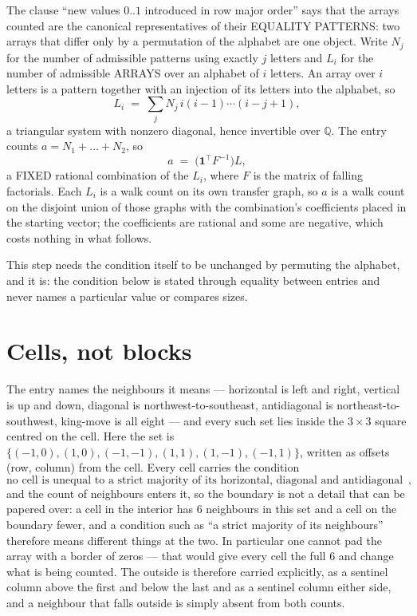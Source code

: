 \documentclass[11pt,a4paper]{article}
\theoremstyle{plain}
\theoremstyle{definition}
\begin{document}
The clause ``new values $0..1$ introduced in row major order'' says that the arrays
counted are the canonical representatives of their EQUALITY PATTERNS: two arrays that differ
only by a permutation of the alphabet are one object. Write $N_j$ for the number of admissible
patterns using exactly $j$ letters and $L_i$ for the number of admissible ARRAYS over an
alphabet of $i$ letters. An array over $i$ letters is a pattern together with an injection of
its letters into the alphabet, so
\[
L_i\;=\;\sum_{j}N_j\,i(i-1)\cdots(i-j+1),
\]
a triangular system with nonzero diagonal, hence invertible over $\mathbb{Q}$. The entry
counts $a=N_1+\dots+N_{2}$, so
\[
a\;=\;\bigl(\mathbf{1}^{\!\top}F^{-1}\bigr)L ,
\]
a FIXED rational combination of the $L_i$, where $F$ is the matrix of falling factorials.
Each $L_i$ is a walk count on its own transfer graph, so $a$ is a walk count on the disjoint
union of those graphs with the combination's coefficients placed in the starting vector; the
coefficients are rational and some are negative, which costs nothing in what follows.

This step needs the condition itself to be unchanged by permuting the alphabet, and it is:
the condition below is stated through equality between entries and never names a particular
value or compares sizes.

\section{Cells, not blocks}

The entry names the neighbours it means --- horizontal is left and right, vertical is up and
down, diagonal is northwest-to-southeast, antidiagonal is northeast-to-southwest, king-move is
all eight --- and every such set lies inside the $3\times3$ square centred on the cell. Here
the set is $\{(-1,0), (1,0), (-1,-1), (1,1), (1,-1), (-1,1)\}$, written as offsets (row, column) from the cell. Every cell carries
the condition
\[
\text{no cell is unequal to a strict majority of its horizontal, diagonal and antidiagonal neighbours},
\]
and the count of neighbours enters it, so the boundary is not a detail that can be papered
over: a cell in the interior has $6$ neighbours in this set and a cell on the boundary
fewer, and a condition such as ``a strict majority of its neighbours'' therefore means
different things at the two. In particular one cannot pad the array with a border of zeros ---
that would give every cell the full $6$ and change what is being counted. The outside is
therefore carried
explicitly, as a sentinel column above the first and below the last and as a sentinel column
either side, and a neighbour that falls outside is simply absent from both counts.
\end{document}
